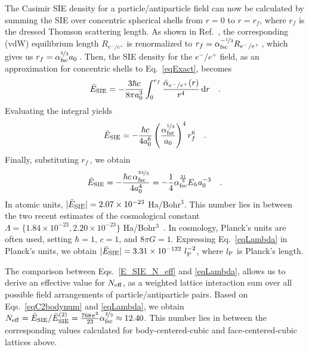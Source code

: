 \documentclass[aps,prl,twocolumn,showpacs,groupaddress]{revtex4-1}
\newcommand{\diff}{\mathrm{d}}
\newcommand{\rrr}[1]{{\color{black}#1}}
\begin{document}
The Casimir SIE density for a particle/antiparticle field can now be calculated by summing the SIE over concentric spherical shells from $r=0$ to $r=r_{f}$, where $r_{f}$ is the dressed Thomson scattering length. As shown in
Ref.~\cite{alphaJPCL}, the corresponding (vdW) equilibrium
length $R_{e^-/e^+}$ is renormalized to 
$r_{f} = \alpha_{\rm fsc}^{-\nicefrac{1}{3}} R_{e^-/e^+}\,$, 
which gives us $r_{f} = \alpha_{\rm fsc}^{\nicefrac{5}{3}} a_0\,$. Then, the SIE density for the $e^-/e^+$ field, as an approximation for concentric shells to Eq.~\eqref{eqExact}, 
becomes~\cite{Casimir1948,Casimir-Cavity}
\begin{equation}
\bar{E}_{\rm{SIE}} = - \frac{3 \hbar c}{8 \pi a_0^3} \int_{0}^{r_{f}} \frac{\bar{\alpha}_{e^-/e^+}(r)}{r^4}\, \diff r \quad .
\label{E_SIE}
\end{equation}
Evaluating the integral yields
\begin{equation}
\bar{E}_{\rm{SIE}} = - \frac{\hbar c}{4 a_0^6} 
\left(\frac{\alpha_{\rm fsc}^{\nicefrac{1}{3}}}{a_0}\right)^4
r_f^6 \quad .
\label{E_SIE_r_f}
\end{equation}
Finally, substituting $r_f\,$, we obtain
\begin{equation}
\bar{E}_{\rm{SIE}} = - \frac{\hbar c\, \alpha_{\rm fsc}^{\nicefrac{34}{3}}}{4 a_0^4} = - \frac{1}{4} 
\alpha_{\rm fsc}^{\frac{31}{3}} E_h a_0^{-3} \quad .
\label{eqLambda}
\end{equation}
\rrr{In} atomic units, $|\bar{E}_{\rm{SIE}}| = 2.07 \times 10^{-23}$ Ha/Bohr$^3$. This number lies in between the two recent estimates of the cosmological constant $\Lambda = \{1.84 \times 10^{-23}, 2.20 \times 10^{-23}\}$ Ha/Bohr$^3$~\cite{Astroconstants}. In cosmology, Planck's units are often used, setting $\hbar=1$, $c=1$, and $8 \pi G=1$. Expressing Eq.~\eqref{eqLambda} in Planck's units, we obtain $|\bar{E}_{\rm{SIE}}|=3.31\times10^{-122} \,\, l_{\rm P}^{-2}$, where $l_{\rm P}$ is Planck's length.  

The comparison between Eqs.~\eqref{E_SIE_N_eff} and \eqref{eqLambda}, allows us to derive an effective value for $N_{\rm eff}$, as a weighted lattice interaction sum over all possible field arrangements of particle/antiparticle pairs.
Based on Eqs.~\eqref{eqC2bodynum} and \eqref{eqLambda}, we obtain 
$N_{\rm eff} = \bar{E}_{\rm{SIE}} / \bar{E}^{(2)}_{\rm{SIE}} = \frac{768 \pi^2}{23} \alpha_{\rm fsc}^{\nicefrac{2}{3}} \approx 12.40$. 
This number lies in between the corresponding values calculated for body-centered-cubic and face-centered-cubic lattices above.  
\end{document}
